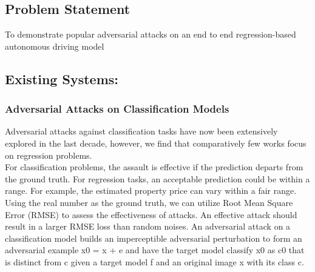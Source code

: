 \documentclass[ 12pt,a4paper,twocolumn,fleqn]{article}
\begin{document}
\subsection{Problem Statement}
To demonstrate popular adversarial attacks on an end to end regression-based autonomous driving model\\
\subsection{Existing Systems:}
\subsubsection{Adversarial Attacks on Classification Models}
Adversarial attacks against classification tasks have now been extensively explored in the last decade, however, we find that comparatively few works focus on regression problems.\\
%
For classification problems, the assault is effective if the prediction departs from the ground truth. For regression tasks, an acceptable prediction could be within a range. For example, the estimated property price can vary within a fair range. Using the real number as the ground truth, we can utilize Root Mean Square Error (RMSE) to assess the effectiveness of attacks. An effective attack should result in a larger RMSE loss than random noises. An adversarial attack on a classification model builds an imperceptible adversarial perturbation to form an adversarial example x0 = x + e and have the target model classify x0 as c0 that is distinct from c given a target model f and an original image x with its class c.\\
\end{document}
